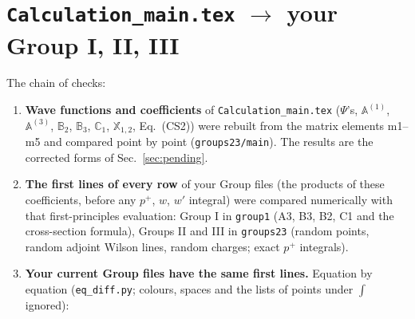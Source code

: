 \documentclass[10pt]{article}
\def\mf#1{\mathbb{#1}}
\begin{document}
\section{\texttt{Calculation\_main.tex} $\to$ your Group I, II, III}\label{sec:chain}
The chain of checks:
\begin{enumerate}
\item \textbf{Wave functions and coefficients} of \texttt{Calculation\_main.tex} ($\Psi$'s, $\mf A^{(1)}$, $\mf A^{(3)}$, $\mf B_2$, $\mf B_3$, $\mf C_1$, $\mathbb X_{1,2}$, Eq.~(CS2)) were rebuilt from the matrix elements m1--m5 and compared point by point (\texttt{groups23/main}). The results are the corrected forms of Sec.~\ref{sec:pending}.
\item \textbf{The first lines of every row} of your Group files (the products of these coefficients, before any $p^+$, $w$, $w'$ integral) were compared numerically with that first-principles evaluation: Group I in \texttt{group1} (A3, B3, B2, C1 and the cross-section formula), Groups II and III in \texttt{groups23} (random points, random adjoint Wilson lines, random charges; exact $p^+$ integrals).
\item \textbf{Your current Group files have the same first lines.} Equation by equation (\texttt{eq\_diff.py}; colours, spaces and the lists of points under $\int$ ignored):
\end{enumerate}
\end{document}
